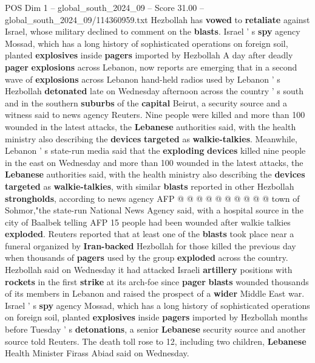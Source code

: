 \begin{textsample}{POS Dim 1 – global\_south\_2024\_09 – Score 31.00 – global\_south\_2024\_09/114360959.txt}  \label{ex:f1_pos_035}
Hezbollah has \textbf{vowed} to \textbf{retaliate} against Israel, whose military declined to comment on the \textbf{blasts}.
Israel ' s \textbf{spy} agency Mossad, which has a long history of sophisticated operations on foreign soil, planted \textbf{explosives} inside \textbf{pagers} imported by Hezbollah A day after deadly \textbf{pager} \textbf{explosions} across Lebanon, now reports are emerging that in a second wave of \textbf{explosions} across Lebanon hand-held radios used by Lebanon ' s Hezbollah \textbf{detonated} late on Wednesday afternoon across the country ' s south and in the southern \textbf{suburbs} of the \textbf{capital} Beirut, a security source and a witness said to news agency Reuters.
Nine people were killed and more than 100 wounded in the latest attacks, the \textbf{Lebanese} authorities said, with the health ministry also describing the \textbf{devices} \textbf{targeted} as \textbf{walkie-talkies}.
Meanwhile, Lebanon ' s state-run media said that the \textbf{exploding} \textbf{devices} killed nine people in the east on Wednesday and more than 100 wounded in the latest attacks, the \textbf{Lebanese} authorities said, with the health ministry also describing the \textbf{devices} \textbf{targeted} as \textbf{walkie-talkies}, with similar \textbf{blasts} reported in other Hezbollah \textbf{strongholds}, according to news agency AFP @ @ @ @ @ @ @ @ @ @ town of Sohmor,"the state-run National News Agency said, with a hospital source in the city of Baalbek telling AFP 15 people had been wounded after walkie talkies \textbf{exploded}.
Reuters reported that at least one of the \textbf{blasts} took place near a funeral organized by \textbf{Iran-backed} Hezbollah for those killed the previous day when thousands of \textbf{pagers} used by the group \textbf{exploded} across the country.
Hezbollah said on Wednesday it had attacked Israeli \textbf{artillery} positions with \textbf{rockets} in the first \textbf{strike} at its arch-foe since \textbf{pager} \textbf{blasts} wounded thousands of its members in Lebanon and raised the prospect of a \textbf{wider} Middle East war.
Israel ' s \textbf{spy} agency Mossad, which has a long history of sophisticated operations on foreign soil, planted \textbf{explosives} inside \textbf{pagers} imported by Hezbollah months before Tuesday ' s \textbf{detonations}, a senior \textbf{Lebanese} security source and another source told Reuters.
The death toll rose to 12, including two children, \textbf{Lebanese} Health Minister Firass Abiad said on Wednesday.

\end{textsample}
